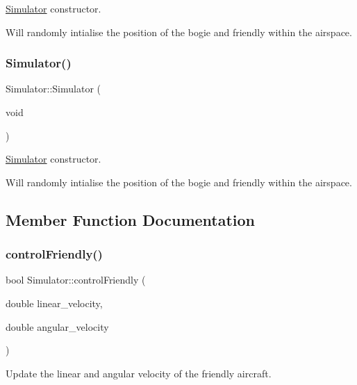 \hyperlink{classSimulator}{Simulator} constructor. 

Will randomly intialise the position of the bogie and friendly within the airspace. \mbox{\label{classSimulator_a62ab66763cb9e6cccbe88d45ab55547f}} 
\subsubsection{\texorpdfstring{Simulator()}{Simulator()}\hspace{0.1cm}{\footnotesize\ttfamily [2/2]}}
{\footnotesize\ttfamily Simulator\+::\+Simulator (\begin{DoxyParamCaption}\item[{void}]{ }\end{DoxyParamCaption})}



\hyperlink{classSimulator}{Simulator} constructor. 

Will randomly intialise the position of the bogie and friendly within the airspace. 

\subsection{Member Function Documentation}
\mbox{\label{classSimulator_adb1cff57466c3b03fd738036cb9cee63}} 
\subsubsection{\texorpdfstring{control\+Friendly()}{controlFriendly()}\hspace{0.1cm}{\footnotesize\ttfamily [1/2]}}
{\footnotesize\ttfamily bool Simulator\+::control\+Friendly (\begin{DoxyParamCaption}\item[{double}]{linear\+\_\+velocity,  }\item[{double}]{angular\+\_\+velocity }\end{DoxyParamCaption})}



Update the linear and angular velocity of the friendly aircraft. 


